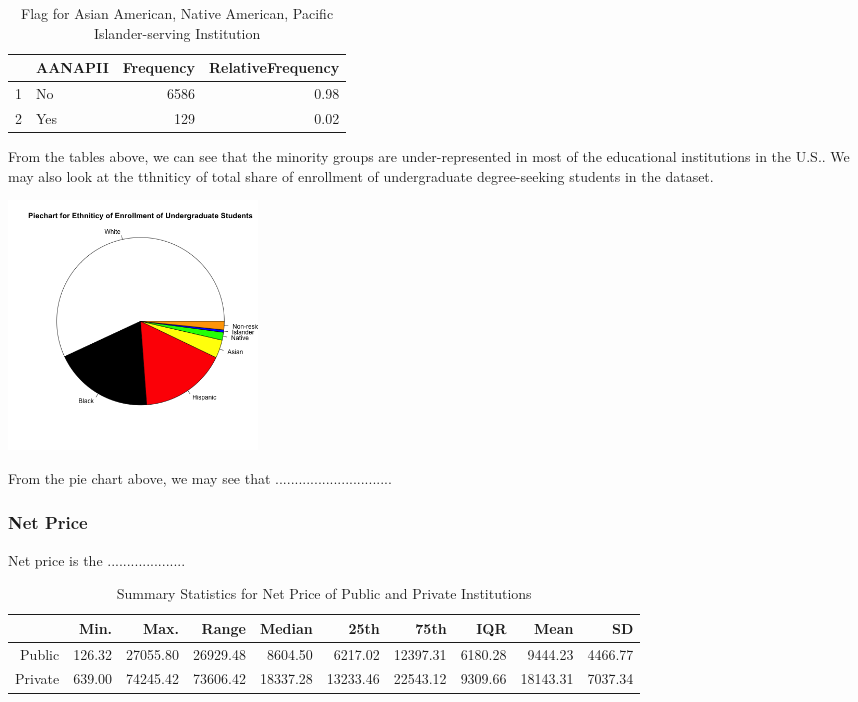 \documentclass{article}\usepackage[]{graphicx}\usepackage[]{color}
\newenvironment{knitrout}{}{} %
\begin{document}
\begin{table}[ht]
\centering
\begin{tabular}{rlrr}
  \hline
 & AANAPII & Frequency & RelativeFrequency \\ 
  \hline
1 & No & 6586 & 0.98 \\ 
  2 & Yes & 129 & 0.02 \\ 
   \hline
\end{tabular}
\caption{Flag for Asian American, Native American, Pacific Islander-serving Institution} 
\end{table}


From the tables above, we can see that the minority groups are under-represented in most of the educational institutions in the U.S.. We may also look at the tthniticy of total share of enrollment of undergraduate degree-seeking students in the dataset.

\begin{knitrout}
\color{fgcolor}

{\centering \includegraphics[width=250px]{../../images/piechart-enrollmentEthnicity} 

}



\end{knitrout}

From the pie chart above, we may see that ..............................

\subsubsection{Net Price}
Net price is the ....................

\begin{table}[ht]
\centering
\begin{tabular}{rrrrrrrrrr}
  \hline
 & Min. & Max. & Range & Median & 25th & 75th & IQR & Mean & SD \\ 
  \hline
Public & 126.32 & 27055.80 & 26929.48 & 8604.50 & 6217.02 & 12397.31 & 6180.28 & 9444.23 & 4466.77 \\ 
  Private & 639.00 & 74245.42 & 73606.42 & 18337.28 & 13233.46 & 22543.12 & 9309.66 & 18143.31 & 7037.34 \\ 
   \hline
\end{tabular}
\caption{Summary Statistics for Net Price of Public and Private Institutions} 
\end{table}
\end{document}
